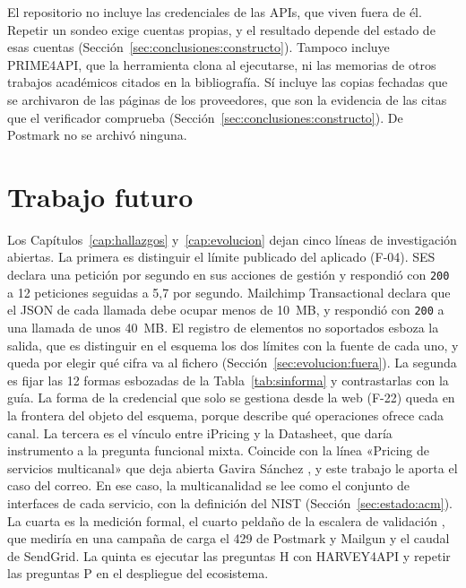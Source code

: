 El repositorio no incluye las credenciales de las APIs, que viven fuera de él.
Repetir un sondeo exige cuentas propias, y el resultado depende del estado de esas cuentas (Sección~\ref{sec:conclusiones:constructo}).
Tampoco incluye PRIME4API, que la herramienta clona al ejecutarse, ni las memorias de otros trabajos académicos citados en la bibliografía.
Sí incluye las copias fechadas que se archivaron de las páginas de los proveedores, que son la evidencia de las citas que el verificador comprueba (Sección~\ref{sec:conclusiones:constructo}).
De Postmark no se archivó ninguna.

\section{Trabajo futuro}\label{sec:conclusiones:futuro}

Los Capítulos~\ref{cap:hallazgos} y~\ref{cap:evolucion} dejan cinco líneas de investigación abiertas.
La primera es distinguir el límite publicado del aplicado (F-04).
SES declara una petición por segundo en sus acciones de gestión y respondió con \texttt{200} a 12 peticiones seguidas a 5,7 por segundo.
Mailchimp Transactional declara que el JSON de cada llamada debe ocupar menos de 10~MB, y respondió con \texttt{200} a una llamada de unos 40~MB.
El registro de elementos no soportados esboza la salida, que es distinguir en el esquema los dos límites con la fuente de cada uno, y queda por elegir qué cifra va al fichero (Sección~\ref{sec:evolucion:fuera}).
La segunda es fijar las 12 formas esbozadas de la Tabla~\ref{tab:sinforma} y contrastarlas con la guía.
La forma de la credencial que solo se gestiona desde la web (F-22) queda en la frontera del objeto del esquema, porque describe qué operaciones ofrece cada canal.
La tercera es el vínculo entre iPricing y la Datasheet, que daría instrumento a la pregunta funcional mixta.
Coincide con la línea «Pricing de servicios multicanal» que deja abierta Gavira Sánchez \citep{gavira2026tfm}, y este trabajo le aporta el caso del correo.
En ese caso, la multicanalidad se lee como el conjunto de interfaces de cada servicio, con la definición del NIST (Sección~\ref{sec:estado:acm}).
La cuarta es la medición formal, el cuarto peldaño de la escalera de validación \citep{datasheetusagetesting}, que mediría en una campaña de carga el 429 de Postmark y Mailgun y el caudal de SendGrid.
La quinta es ejecutar las preguntas H con HARVEY4API y repetir las preguntas P en el despliegue del ecosistema.

